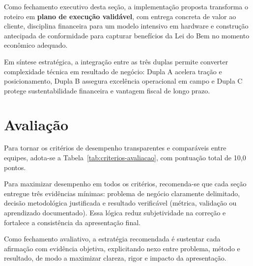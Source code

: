 Como fechamento executivo desta seção, a implementação proposta transforma o roteiro em \textbf{plano de execução validável}, com entrega concreta de valor ao cliente, disciplina financeira para um modelo intensivo em hardware e construção antecipada de conformidade para capturar benefícios da Lei do Bem no momento econômico adequado.

Em síntese estratégica, a integração entre as três duplas permite converter complexidade técnica em resultado de negócio: Dupla A acelera tração e posicionamento, Dupla B assegura excelência operacional em campo e Dupla C protege sustentabilidade financeira e vantagem fiscal de longo prazo.

\section{Avaliação}

Para tornar os critérios de desempenho transparentes e comparáveis entre equipes, adota-se a Tabela~\ref{tab:criterios-avaliacao}, com pontuação total de 10,0 pontos.

Para maximizar desempenho em todos os critérios, recomenda-se que cada seção entregue três evidências mínimas: problema de negócio claramente delimitado, decisão metodológica justificada e resultado verificável (métrica, validação ou aprendizado documentado). Essa lógica reduz subjetividade na correção e fortalece a consistência da apresentação final.

Como fechamento avaliativo, a estratégia recomendada é sustentar cada afirmação com evidência objetiva, explicitando nexo entre problema, método e resultado, de modo a maximizar clareza, rigor e impacto da apresentação.

